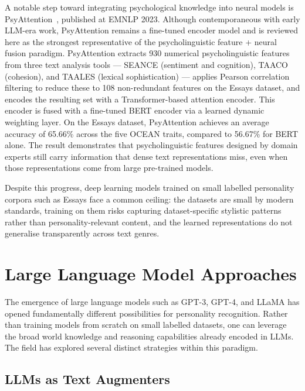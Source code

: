 \documentclass[../main.tex]{subfiles}
\begin{document}
A notable step toward integrating psychological knowledge into neural models is PsyAttention~\cite{zhang2023psyattention}, published at EMNLP 2023. Although contemporaneous with early LLM-era work, PsyAttention remains a fine-tuned encoder model and is reviewed here as the strongest representative of the psycholinguistic feature + neural fusion paradigm. PsyAttention extracts 930 numerical psycholinguistic features from three text analysis tools --- SEANCE (sentiment and cognition), TAACO (cohesion), and TAALES (lexical sophistication) --- applies Pearson correlation filtering to reduce these to 108 non-redundant features on the Essays dataset, and encodes the resulting set with a Transformer-based attention encoder. This encoder is fused with a fine-tuned BERT encoder via a learned dynamic weighting layer. On the Essays dataset, PsyAttention achieves an average accuracy of 65.66\% across the five OCEAN traits, compared to 56.67\% for BERT alone. The result demonstrates that psycholinguistic features designed by domain experts still carry information that dense text representations miss, even when those representations come from large pre-trained models.

Despite this progress, deep learning models trained on small labelled personality corpora such as Essays face a common ceiling: the datasets are small by modern standards, training on them risks capturing dataset-specific stylistic patterns rather than personality-relevant content, and the learned representations do not generalise transparently across text genres.

\section{Large Language Model Approaches}
\label{sec:llm-methods}

The emergence of large language models such as GPT-3, GPT-4, and LLaMA has opened fundamentally different possibilities for personality recognition. Rather than training models from scratch on small labelled datasets, one can leverage the broad world knowledge and reasoning capabilities already encoded in LLMs. The field has explored several distinct strategies within this paradigm.

\subsection{LLMs as Text Augmenters}
\end{document}

